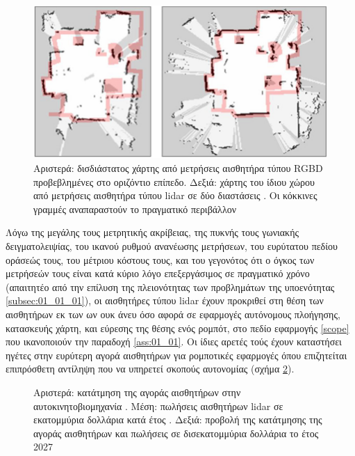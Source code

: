 \begin{figure}\centering
  \includegraphics[scale=0.5]{./figures/parts/01/chapters/01/sections/01/rgbd_lidar_map.png}
  \caption{\small Αριστερά: δισδιάστατος χάρτης από μετρήσεις αισθητήρα τύπου
           RGBD προβεβλημένες στο οριζόντιο επίπεδο. Δεξιά: χάρτης του ίδιου
           χώρου από μετρήσεις αισθητήρα τύπου lidar σε δύο διαστάσεις
           \cite{Oliver2012}. Οι κόκκινες γραμμές αναπαραστούν το πραγματικό
           περιβάλλον}
  \label{fig:rgbd_lidar_map}
\end{figure}

Λόγω της μεγάλης τους μετρητικής ακρίβειας, της πυκνής τους γωνιακής
δειγματολειψίας, του ικανού ρυθμού ανανέωσης μετρήσεων, του ευρύτατου πεδίου
οράσεώς τους, του μέτριου κόστους τους, και του γεγονότος ότι ο όγκος των
μετρήσεών τους είναι κατά κύριο λόγο επεξεργάσιμος σε πραγματικό χρόνο
(απαιτητέο από την επίλυση της πλειονότητας των προβλημάτων της υποενότητας
\ref{subsec:01_01_01}), οι αισθητήρες τύπου lidar έχουν προκριθεί στη θέση των
αισθητήρων εκ των ων ουκ άνευ όσο αφορά σε εφαρμογές αυτόνομους πλοήγησης,
κατασκευής χάρτη, και εύρεσης της θέσης ενός ρομπότ, στο πεδίο εφαρμογής
\ref{scope} που ικανοποιούν την παραδοχή \ref{ass:01_01}. Οι ίδιες αρετές τούς
έχουν καταστήσει ηγέτες στην ευρύτερη αγορά αισθητήρων για ρομποτικές εφαρμογές
όπου επιζητείται επιπρόσθετη αντίληψη που να υπηρετεί σκοπούς αυτονομίας (σχήμα
\ref{fig:lidar_share}).


\begin{figure}\centering
  
  \caption{\small Αριστερά: κατάτμηση της αγοράς αισθητήρων στην
           αυτοκινητοβιομηχανία \cite{Sighencea2021}. Μέση: πωλήσεις αισθητήρων
           lidar σε εκατομμύρια δολλάρια κατά έτος \cite{statista1}. Δεξιά:
           προβολή της κατάτμησης της αγοράς αισθητήρων και πωλήσεις σε
           δισεκατομμύρια δολλάρια το έτος 2027 \cite{statista2}}
  \label{fig:lidar_share}
\end{figure}


